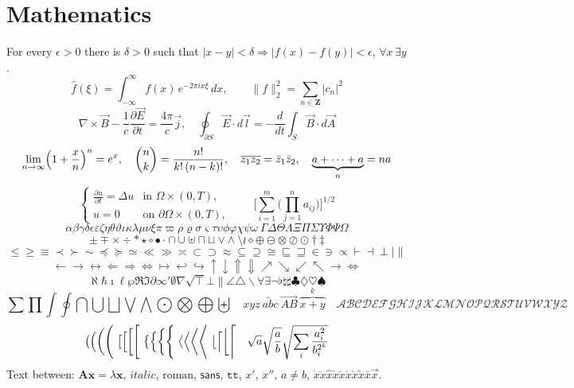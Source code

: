 \documentclass{article}\usepackage[T1]{fontenc}\usepackage{mathptmx}
\begin{document}
\section{Mathematics}
For every $\epsilon>0$ there is $\delta>0$ such that $|x-y|<\delta \Rightarrow |f(x)-f(y)|<\epsilon$, $\forall x\,\exists y$.
\begin{equation} \hat f(\xi)=\int_{-\infty}^{\infty} f(x)\,e^{-2\pi i x\xi}\,dx,\qquad \|f\|_2^2=\sum_{n\in\mathbf{Z}}|c_n|^2 \end{equation}
\begin{equation} \nabla\times\vec{B}-\frac{1}{c}\frac{\partial\vec{E}}{\partial t}=\frac{4\pi}{c}\vec{j},\quad \oint_{\partial S}\vec{E}\cdot d\vec{l}=-\frac{d}{dt}\int_S\vec{B}\cdot d\vec{A} \end{equation}
\[ \lim_{n\to\infty}\Bigl(1+\frac{x}{n}\Bigr)^n=e^x,\quad {n\choose k}=\frac{n!}{k!\,(n-k)!},\quad \overline{z_1 z_2}=\bar z_1\bar z_2,\quad \underbrace{a+\cdots+a}_{n}=na \]
\[ \left\{\begin{array}{ll} \displaystyle\frac{\partial u}{\partial t}=\Delta u & \mbox{in } \Omega\times(0,T),\\[2mm] u=0 & \mbox{on } \partial\Omega\times(0,T), \end{array}\right. \qquad \Biggl[\sum_{i=1}^{m}\biggl(\prod_{j=1}^{n}a_{ij}\biggr)\Biggr]^{1/2} \]
\[ \alpha\beta\gamma\delta\epsilon\varepsilon\zeta\eta\theta\vartheta\iota\kappa\lambda\mu\nu\xi\pi\varpi\rho\varrho\sigma\varsigma\tau\upsilon\phi\varphi\chi\psi\omega\ \Gamma\Delta\Theta\Lambda\Xi\Pi\Sigma\Upsilon\Phi\Psi\Omega \]
\[ \pm\mp\times\div\ast\star\circ\bullet\cdot\cap\cup\uplus\sqcap\sqcup\vee\wedge\setminus\wr\diamond\oplus\ominus\otimes\oslash\odot\dagger\ddagger \]
\[ \leq\geq\equiv\prec\succ\sim\preceq\succeq\simeq\ll\gg\asymp\subset\supset\approx\subseteq\supseteq\cong\sqsubseteq\sqsupseteq\in\ni\propto\vdash\dashv\perp\mid\parallel \]
\[ \leftarrow\rightarrow\leftrightarrow\Leftarrow\Rightarrow\Leftrightarrow\mapsto\hookleftarrow\hookrightarrow\uparrow\downarrow\Uparrow\Downarrow\nearrow\searrow\swarrow\nwarrow\longrightarrow\Longleftrightarrow \]
\[ \aleph\hbar\imath\ell\wp\Re\Im\partial\infty\prime\emptyset\nabla\surd\top\bot\|\angle\triangle\backslash\forall\exists\neg\flat\natural\sharp\clubsuit\diamondsuit\heartsuit\spadesuit \]
\[ \sum\prod\int\oint\bigcap\bigcup\bigsqcup\bigvee\bigwedge\bigodot\bigotimes\bigoplus\biguplus \quad \widehat{xyz}\ \widetilde{abc}\ \overrightarrow{AB}\ \overbrace{x+y}^{k} \quad \mathcal{ABCDEFGHIJKLMNOPQRSTUVWXYZ} \]
\[ \bigl(\Bigl(\biggl(\Biggl(\ \bigl[\Bigl[\biggl[\Biggl[\ \bigl\{\Bigl\{\biggl\{\Biggl\{\ \bigl\langle\Bigl\langle\biggl\langle\Biggl\langle\ \bigl\lfloor\Bigl\lceil\biggl\lfloor\Biggl\lceil \quad \sqrt{a}\sqrt{\frac{a}{b}}\sqrt{\sum_{i}\frac{a_i^2}{b_i^{2^k}}} \]
Text between: $\mathbf{A}\mathbf{x}=\lambda\mathbf{x}$, $\mathit{italic}$, $\mathrm{roman}$, $\mathsf{sans}$, $\mathtt{tt}$, $x'$, $x''$, $a\not=b$, $\dot x\ddot x\hat x\check x\breve x\acute x\grave x\tilde x\bar x\vec x$.
\end{document}
